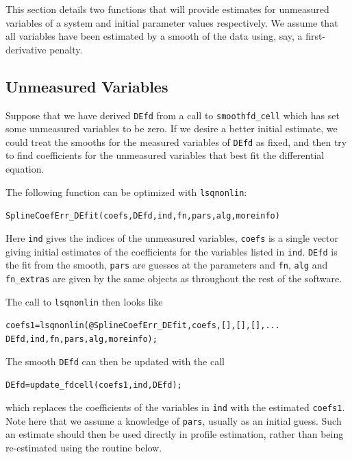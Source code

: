 \documentclass{article}
\newcommand{\nt}    {\noindent}
\begin{document}
This section details two functions that will provide estimates for unmeasured variables of a system
and initial parameter values respectively. We assume that all variables have been estimated by a
smooth of the data using, say, a first-derivative penalty.

\subsection{Unmeasured Variables}

Suppose that we have derived {\tt DEfd} from a call to {\tt smoothfd\_cell} which has set some
unmeasured variables to be zero. If we desire a better initial estimate, we could treat the smooths
for the measured variables of {\tt DEfd} as fixed, and then try to find coefficients for the
unmeasured variables that best fit the differential equation.

The following function can be optimized with {\tt lsqnonlin}:

\begin{alltt}
   SplineCoefErr_DEfit(coefs,DEfd,ind,fn,pars,alg,moreinfo)
\end{alltt}

\nt Here {\tt ind} gives the indices of the unmeasured variables, {\tt coefs} is a single vector
giving initial estimates of the coefficients for the variables listed in {\tt ind}. {\tt DEfd} is
the fit from the smooth, {\tt pars} are guesses at the parameters and {\tt fn}, {\tt alg} and {\tt
fn\_extras} are given by the same objects as throughout the rest of the software.

The call to {\tt lsqnonlin} then looks like

\begin{alltt}
   coefs1 = lsqnonlin(@SplineCoefErr\_DEfit,coefs,[],[],[],...
      DEfd,ind,fn,pars,alg,moreinfo);
\end{alltt}

\nt The smooth {\tt DEfd} can then be updated with the call

\begin{alltt}
   DEfd = update_fdcell(coefs1,ind,DEfd);
\end{alltt}

\nt which replaces the coefficients of the variables in {\tt ind} with the estimated {\tt coefs1}.
Note here that we assume a knowledge of {\tt pars}, usually as an initial guess. Such an estimate
should then be used directly in profile estimation, rather than being re-estimated using the
routine below.
\end{document}
